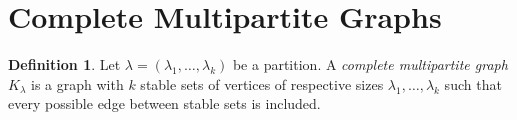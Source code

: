 \documentclass[12pt]{amsart}
\numberwithin{equation}{section}
\theoremstyle{plain}
\theoremstyle{definition}
\newtheorem{definition}[equation]{Definition}
\theoremstyle{remark}
\newtheorem{remark}[equation]{Remark}
\begin{document}




 \section{Complete Multipartite Graphs}
\label{sect:comp_multi_graphs}


 
 \begin{definition}
Let $\lambda=(\lambda_1,\dots,\lambda_k)$ be a partition. A \textit{complete multipartite graph} $K_{\lambda}$ is a graph with $k$ stable sets of vertices of respective sizes $\lambda_1,\dots,\lambda_k$ such that every possible edge between stable sets is included. 

\end{definition}
\end{document}
